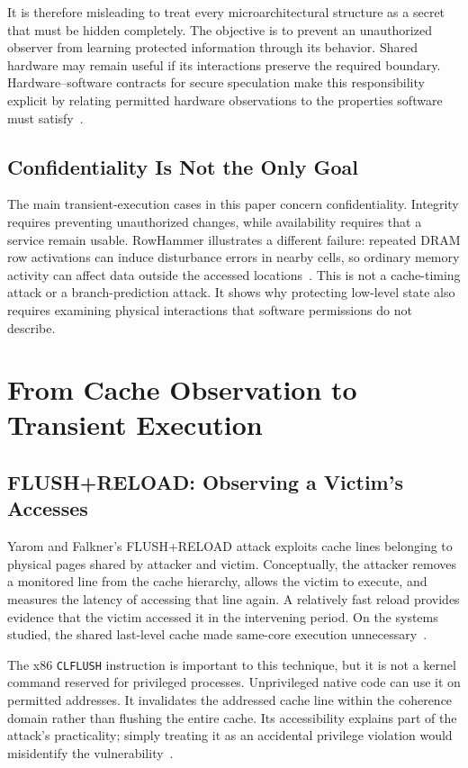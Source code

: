 \documentclass[man,12pt,apacite,nofontenc,nolmodern,floatsintext]{apa6}
\begin{document}
It is therefore misleading to treat every microarchitectural structure as a secret that must be hidden completely. The objective is to prevent an unauthorized observer from learning protected information through its behavior. Shared hardware may remain useful if its interactions preserve the required boundary. Hardware--software contracts for secure speculation make this responsibility explicit by relating permitted hardware observations to the properties software must satisfy~\cite{contracts2021}.

\subsection{Confidentiality Is Not the Only Goal}
The main transient-execution cases in this paper concern confidentiality. Integrity requires preventing unauthorized changes, while availability requires that a service remain usable. RowHammer illustrates a different failure: repeated DRAM row activations can induce disturbance errors in nearby cells, so ordinary memory activity can affect data outside the accessed locations~\cite{kim2014}. This is not a cache-timing attack or a branch-prediction attack. It shows why protecting low-level state also requires examining physical interactions that software permissions do not describe.

\section{From Cache Observation to Transient Execution}
\subsection{FLUSH+RELOAD: Observing a Victim's Accesses}
Yarom and Falkner's FLUSH+RELOAD attack exploits cache lines belonging to physical pages shared by attacker and victim. Conceptually, the attacker removes a monitored line from the cache hierarchy, allows the victim to execute, and measures the latency of accessing that line again. A relatively fast reload provides evidence that the victim accessed it in the intervening period. On the systems studied, the shared last-level cache made same-core execution unnecessary~\cite{yarom2014}.

The x86 \texttt{CLFLUSH} instruction is important to this technique, but it is not a kernel command reserved for privileged processes. Unprivileged native code can use it on permitted addresses. It invalidates the addressed cache line within the coherence domain rather than flushing the entire cache. Its accessibility explains part of the attack's practicality; simply treating it as an accidental privilege violation would misidentify the vulnerability~\cite{yarom2014}.
\end{document}
